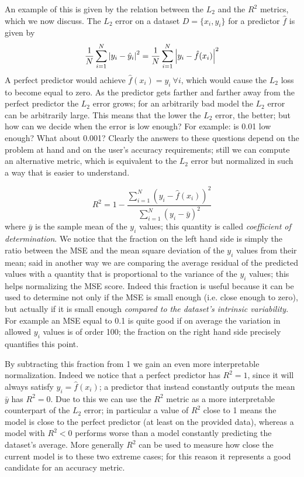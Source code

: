 An example of this is given by the relation between the $L_2$ and the $R^2$ metrics, which we now discuss.
The $L_2$ error on a dataset $D = \{x_i, y_i\}$ for a predictor $\hat{f}$ is given by
\begin{equation*}
    \frac{1}{N}\sum_{i=1}^N \abs{y_i-\hat{y}_i}^2 = \frac{1}{N}\sum_{i=1}^N \abs{y_i-\hat{f}(x_i)}^2
\end{equation*}
A perfect predictor would achieve $\hat{f}(x_i) = y_i \ \forall i$, which would cause the $L_2$ loss to become equal to zero. As the predictor gets farther and farther away from the perfect predictor the $L_2$ error grows; for an arbitrarily bad model the $L_2$ error can be arbitrarily large.
This means that the lower the $L_2$ error, the better; but how can we decide when the error is low enough? For example: is 0.01 low enough? What about 0.001?
Clearly the answers to these questions depend on the problem at hand and on the user's accuracy requirements; still we can compute an alternative metric, which is equivalent to the $L_2$ error but normalized in such a way that is easier to understand.

\begin{equation}
    R^2 = 1 - \frac{\sum_{i=1}^N \left(y_i-\hat{f}(x_i)\right)^2}{\sum_{i=1}^N (y_i-\bar{y})^2}
\end{equation}
where $\bar{y}$ is the sample mean of the $y_i$ values; this quantity is called \emph{coefficient of determination}.
We notice that the fraction on the left hand side is simply the ratio between the MSE and the mean square deviation of the $y_i$ values from their mean; said in another way we are comparing the average residual of the predicted values with a quantity that is proportional to the variance of the $y_i$ values; this helps normalizing the MSE score.
Indeed this fraction is useful because it can be used to determine not only if the MSE is small enough (i.e. close enough to zero), but actually if it is small enough \emph{compared to the dataset's intrinsic variability}. For example an MSE equal to 0.1 is quite good if on average the variation in allowed $y_i$ values is of order 100; the fraction on the right hand side precisely quantifies this point.

By subtracting this fraction from 1 we gain an even more interpretable normalization. Indeed we notice that a perfect predictor has $R^2=1$, since it will always satisfy $y_i=\hat{f}(x_i)$; a predictor that instead constantly outputs the mean $\bar{y}$ has $R^2=0$.
Due to this we can use the $R^2$ metric as a more interpretable counterpart of the $L_2$ error; in particular a value of $R^2$ close to 1 means the model is close to the perfect predictor (at least on the provided data), whereas a model with $R^2<0$ performs worse than a model constantly predicting the dataset's average. More generally $R^2$ can be used to measure how close the current model is to these two extreme cases; for this reason it represents a good candidate for an accuracy metric.

